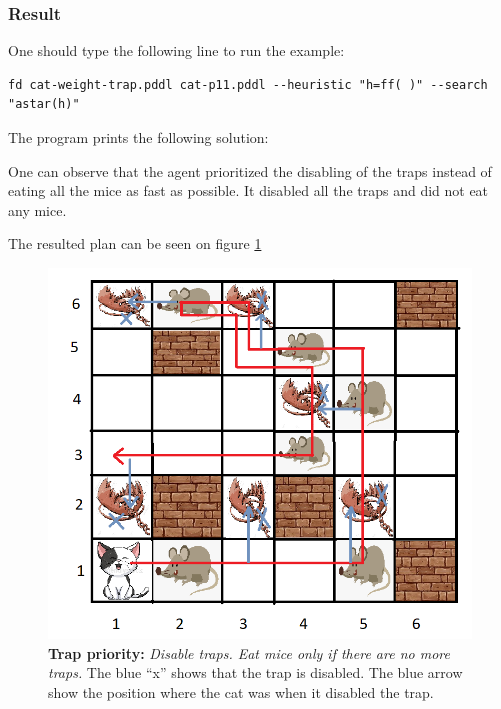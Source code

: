 \subsubsection{Result}

One should type the following line to run the example: 

\begin{lstlisting}[numbers=none]
fd cat-weight-trap.pddl cat-p11.pddl --heuristic "h=ff( )" --search "astar(h)"
\end{lstlisting}

The program prints the following solution:



One can observe that the agent prioritized the disabling of the traps instead of eating all the mice as fast as possible. It disabled all the traps and did not eat any mice.

The resulted plan can be seen on figure \ref{fig:cat_weight_trap}

\begin{figure}[H]
    \centering
    \includegraphics[width=.6\linewidth]{fig/A3/cat_11_plan_trap.png}
    \caption{\textbf{Trap priority:} \textit{Disable traps. Eat mice only if there are no more traps.} The blue ``x'' shows that the trap is disabled. The blue arrow show the position where the cat was when it disabled the trap.} 
    \label{fig:cat_weight_trap}
\end{figure}
